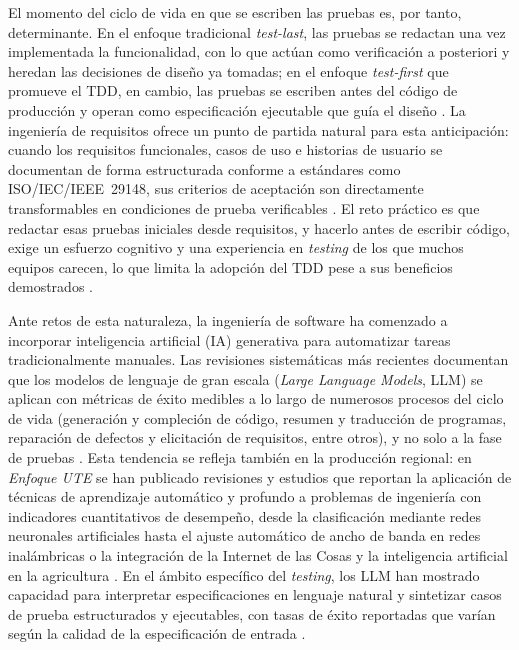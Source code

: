 \documentclass[10pt,journal,twoside,letterpaper]{IEEEtran}
\begin{document}
    El momento del ciclo de vida en que se escriben las pruebas es, por tanto, determinante. En el enfoque tradicional \emph{test-last}, las pruebas se redactan una vez implementada la funcionalidad, con lo que actúan como verificación a posteriori y heredan las decisiones de diseño ya tomadas; en el enfoque \emph{test-first} que promueve el TDD, en cambio, las pruebas se escriben antes del código de producción y operan como especificación ejecutable que guía el diseño \cite{beck2003tdd,erdogmus2005testfirst}. La ingeniería de requisitos ofrece un punto de partida natural para esta anticipación: cuando los requisitos funcionales, casos de uso e historias de usuario se documentan de forma estructurada conforme a estándares como ISO/IEC/IEEE~29148, sus criterios de aceptación son directamente transformables en condiciones de prueba verificables \cite{iso29148}. El reto práctico es que redactar esas pruebas iniciales desde requisitos, y hacerlo antes de escribir código, exige un esfuerzo cognitivo y una experiencia en \emph{testing} de los que muchos equipos carecen, lo que limita la adopción del TDD pese a sus beneficios demostrados \cite{ghafari2020inconclusive}.
    
    Ante retos de esta naturaleza, la ingeniería de software ha comenzado a incorporar inteligencia artificial (IA) generativa para automatizar tareas tradicionalmente manuales. Las revisiones sistemáticas más recientes documentan que los modelos de lenguaje de gran escala (\emph{Large Language Models}, LLM) se aplican con métricas de éxito medibles a lo largo de numerosos procesos del ciclo de vida (generación y compleción de código, resumen y traducción de programas, reparación de defectos y elicitación de requisitos, entre otros), y no solo a la fase de pruebas \cite{hou2024llm4se,carleton2024genai}. Esta tendencia se refleja también en la producción regional: en \emph{Enfoque UTE} se han publicado revisiones y estudios que reportan la aplicación de técnicas de aprendizaje automático y profundo a problemas de ingeniería con indicadores cuantitativos de desempeño, desde la clasificación mediante redes neuronales artificiales \cite{molina2024ann} hasta el ajuste automático de ancho de banda en redes inalámbricas \cite{carrillo2025ai} o la integración de la Internet de las Cosas y la inteligencia artificial en la agricultura \cite{basurto2026iotai}. En el ámbito específico del \emph{testing}, los LLM han mostrado capacidad para interpretar especificaciones en lenguaje natural y sintetizar casos de prueba estructurados y ejecutables, con tasas de éxito reportadas que varían según la calidad de la especificación de entrada \cite{wang2024survey,yang2024evaluation,rehan2025harnessing,bhatia2024unit,korraprolu2025testcase,takerngsaksiri2025pytester}.
    
\end{document}
